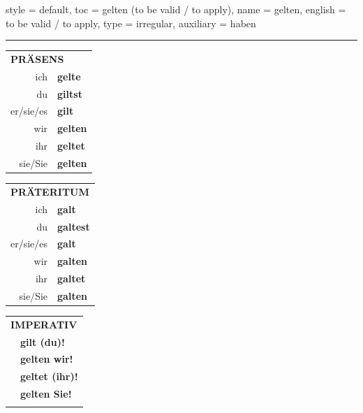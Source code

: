 \begin{verbentry}{
  style = {default},
  toc = {gelten (to be valid / to apply)},
  name = {gelten},
  english = {to be valid / to apply},
  type = {irregular},
  auxiliary = {haben}
}
 
    
     \vspace{5pt}

    \hrule
    
    \vspace{5pt}

  \begin{tabular}{rl}
     \multicolumn{2}{l}{\textbf{PRÄSENS} }\\
    ich & \textbf{gelte}\\
    du & \textbf{giltst}\\
    er/sie/es & \textbf{gilt}\\
    wir & \textbf{gelten}\\
    ihr & \textbf{geltet}\\
    sie/Sie & \textbf{gelten}\\
  \end{tabular}
  \hfill
     \begin{tabular}{rl}
    \multicolumn{2}{l}{\textbf{PRÄTERITUM} }\\
    ich & \textbf{galt}\\
    du & \textbf{galtest}\\
    er/sie/es & \textbf{galt}\\
    wir & \textbf{galten}\\
    ihr & \textbf{galtet}\\
    sie/Sie & \textbf{galten}\\
  \end{tabular}
  \hfill
  \begin{tabular}{rl}
     \multicolumn{2}{l}{\textbf{IMPERATIV} }\\
   & \textbf{gilt (du)!}\\
   & \textbf{gelten wir!}\\
   & \textbf{geltet (ihr)!}\\
   & \textbf{gelten Sie!}\\
   & \vspace{10pt}
  \end{tabular}

    \vspace{10pt}


\end{verbentry}
